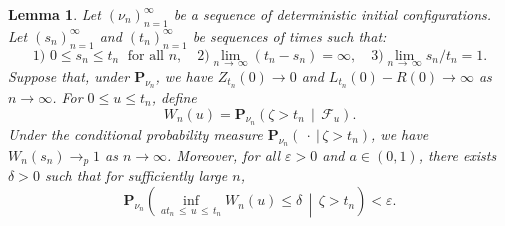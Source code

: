\documentclass[10pt]{amsart}
\newtheorem{lemm}[theo]{Lemma}\newtheorem{prop}[theo]{Proposition}\newtheorem{coro}[theo]{Corollary}\newtheorem{conj}[theo]{Conjecture}
\theoremstyle{definition}\newtheorem{defi}[theo]{Definition}\newtheorem{rema}[theo]{Remark}\newtheorem{exam}[theo]{Example}\newtheorem{exem}[theo]{Example}\newtheorem{nota}[theo]{Notation}
\newcommand*\eps{\varepsilon}
\renewcommand*\P{\mathbf{P}}
\newcommand\F{\mathcal{F}}
\newcommand{\1} {\mathds{1}}
\begin{document}
\begin{lemm}\label{MGsurvival}
Let $(\nu_n)_{n=1}^{\infty}$ be a sequence of deterministic initial configurations. Let $(s_n)_{n=1}^{\infty}$ and $(t_n)_{n=1}^{\infty}$ be sequences of times such that:
\begin{equation}\label{sntn}
\text{1) } 0 \leq s_n \leq t_n \;\text{ for all } n, \quad\text{2)} \lim_{n\,\rightarrow\,\infty} (t_n - s_n) = \infty, \quad\text{3)}\lim_{n\,\rightarrow\,\infty} s_n/t_n = 1.
\end{equation}
Suppose that, under $\P_{\nu_n}$, we have $Z_{t_n}(0) \rightarrow 0$ and $L_{t_n}(0) - R(0) \rightarrow \infty$ as $n \rightarrow \infty$. For $0 \leq u \leq t_n$, define
\begin{equation}\label{Wdef}
W_n(u) = \P_{\nu_n}\left(\zeta > t_n \,\middle|\, \F_u\right).
\end{equation}
Under the conditional probability measure $\P_{\nu_n}(\: \cdot \:|\,\zeta > t_n)$, we have $W_n(s_n) \rightarrow_p 1$ as $n \rightarrow \infty$. Moreover, for all $\eps > 0$ and $a \in (0, 1)$, there exists $\delta > 0$ such that for sufficiently large $n$,
\begin{equation}\label{infW}
\P_{\nu_n}\left(\inf_{at_n\,\leq\,u\,\leq\,t_n} W_n(u) \leq \delta \,\middle|\, \zeta > t_n \right) < \eps.
\end{equation}
\end{lemm}
\end{document}
